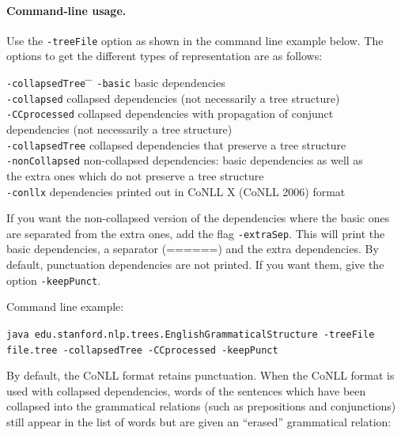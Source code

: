 \documentclass[11pt,letterpaper]{article}
\begin{document}
\paragraph{Command-line usage.} Use the \texttt{-treeFile} option as shown in the command line example below. The options to get the different types of representation are as follows:
\begin{tabbing}
\hspace{.3cm} \= \texttt{-collapsedTree} \= \hspace{.3cm} \= \kill
\> \texttt{-basic} \>\> basic dependencies\\
\> \texttt{-collapsed} \>\> collapsed dependencies (not necessarily a tree structure)\\
\> \texttt{-CCprocessed} \>\> collapsed dependencies with propagation of conjunct \\
\> \> \> dependencies (not necessarily a tree structure)\\
\> \texttt{-collapsedTree} \>\> collapsed dependencies that preserve a tree structure\\
\> \texttt{-nonCollapsed} \>\> non-collapsed dependencies: basic dependencies as well as\\
\> 						 \>\> the extra ones which do not preserve a tree structure\\
\> \texttt{-conllx} \>\> dependencies printed out in CoNLL X (CoNLL 2006) format
\end{tabbing}

\noindent If you want the non-collapsed version of the dependencies where the basic ones are separated from the extra ones, add the flag \texttt{-extraSep}. This will print the basic dependencies, a separator (======) and the extra dependencies.
By default, punctuation dependencies are not printed.  If you want
them, give the option \texttt{-keepPunct}.

\bigskip

\noindent Command line example:\\
{\hangindent=0.5in\raggedright\texttt{java  edu.stanford.nlp.trees.EnglishGrammaticalStructure -treeFile
    file.tree -collapsedTree -CCprocessed -keepPunct} \\}

\vspace*{.4cm}
\noindent By default, the CoNLL format retains punctuation. When the
CoNLL format is used with collapsed dependencies, words of the
sentences which have been collapsed into the grammatical relations
(such as prepositions and conjunctions) still appear in the list of
words but are given an ``erased'' grammatical relation:
\end{document}
